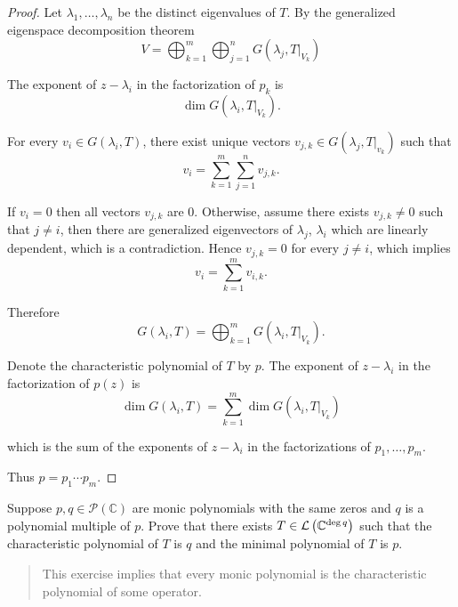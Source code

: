 \begin{proof}
    Let $\lambda_{1}, \ldots, \lambda_{n}$ be the distinct eigenvalues of $T$. By the generalized eigenspace decomposition theorem
    \[
        V = \bigoplus^{m}_{k=1}\bigoplus^{n}_{j=1}G(\lambda_{j}, T\vert_{V_{k}})
    \]

    The exponent of $z - \lambda_{i}$ in the factorization of $p_{k}$ is
    \[
        \dim G(\lambda_{i}, T\vert_{V_{k}}).
    \]

    For every $v_{i}\in G(\lambda_{i}, T)$, there exist unique vectors $v_{j,k}\in G(\lambda_{j}, T\vert_{v_{k}})$ such that
    \[
        v_{i} = \sum^{m}_{k=1}\sum^{n}_{j=1}v_{j,k}.
    \]

    If $v_{i} = 0$ then all vectors $v_{j,k}$ are $0$. Otherwise, assume there exists $v_{j,k}\ne 0$ such that $j\ne i$, then there are generalized eigenvectors of $\lambda_{j}$, $\lambda_{i}$ which are linearly dependent, which is a contradiction. Hence $v_{j,k} = 0$ for every $j\ne i$, which implies
    \[
        v_{i} = \sum^{m}_{k=1}v_{i,k}.
    \]

    Therefore
    \[
        G(\lambda_{i}, T) = \bigoplus^{m}_{k=1}G(\lambda_{i}, T\vert_{V_{k}}).
    \]

    Denote the characteristic polynomial of $T$ by $p$. The exponent of $z - \lambda_{i}$ in the factorization of $p(z)$ is
    \[
        \dim G(\lambda_{i}, T) = \sum^{m}_{k=1}\dim G(\lambda_{i}, T\vert_{V_{k}})
    \]

    which is the sum of the exponents of $z - \lambda_{i}$ in the factorizations of $p_{1}, \ldots, p_{m}$.

    Thus $p = p_{1}\cdots p_{m}$.
\end{proof}
\newpage

\begin{exercise}\label{chapter8:sectionB:exercise21}
    Suppose $p, q\in\mathscr{P}(\mathbb{C})$ are monic polynomials with the same zeros and $q$ is a polynomial multiple of $p$. Prove that there exists $T\in\mathcal{L}\left({\mathbb{C}^{\deg q}}\right)$ such that the characteristic polynomial of $T$ is $q$ and the minimal polynomial of $T$ is $p$.
\end{exercise}

\begin{quote}
    This exercise implies that every monic polynomial is the characteristic polynomial of some operator.
\end{quote}

